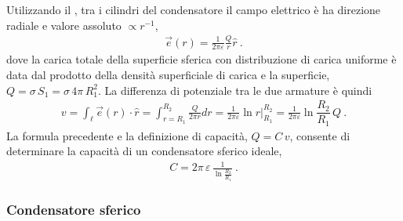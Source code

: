 \documentclass[letterpaper,10pt,italian]{jupyterBook}
\begin{document}
\sphinxAtStartPar
Utilizzando il {\hyperref[\detokenize{ch/electromagnetism/electrostatics:physics-hs-electromagnetism-electrostatics-maxwell-gauss}]{}}, tra i cilindri del condensatore il campo elettrico è ha direzione radiale e valore assoluto \(\propto r^{-1}\),
\begin{equation*}
\begin{split}\vec{e}(r) = \frac{1}{2 \pi \varepsilon} \frac{Q}{r} \hat{r} \ .\end{split}
\end{equation*}
\sphinxAtStartPar
dove la carica totale della superficie sferica con distribuzione di carica uniforme è data dal prodotto della densità superficiale di carica e la superficie, \(Q = \sigma \, S_1 = \sigma \, 4 \pi \, R_1^2\).
La differenza di potenziale tra le due armature è quindi
\begin{equation*}
\begin{split}v = \int_{\ell} \vec{e}(r) \cdot \hat{r} = \int_{r=R_1}^{R_2} \frac{Q}{2 \pi r} dr = \frac{1}{2 \pi \varepsilon} \left.\ln r \right|_{R_1}^{R_2} = \frac{1}{2 \pi \varepsilon} \ln \dfrac{R_2}{R_1} \, Q \ .\end{split}
\end{equation*}
\sphinxAtStartPar
La formula precedente e la definizione di capacità, \(Q = C \, v\), consente di determinare la capacità di un condensatore sferico ideale,
\begin{equation*}
\begin{split}C = 2 \pi \, \varepsilon \,  \frac{1}{\ln \frac{R_2}{R_1}} \ .\end{split}
\end{equation*}\subsubsection*{Condensatore sferico}
\end{document}
